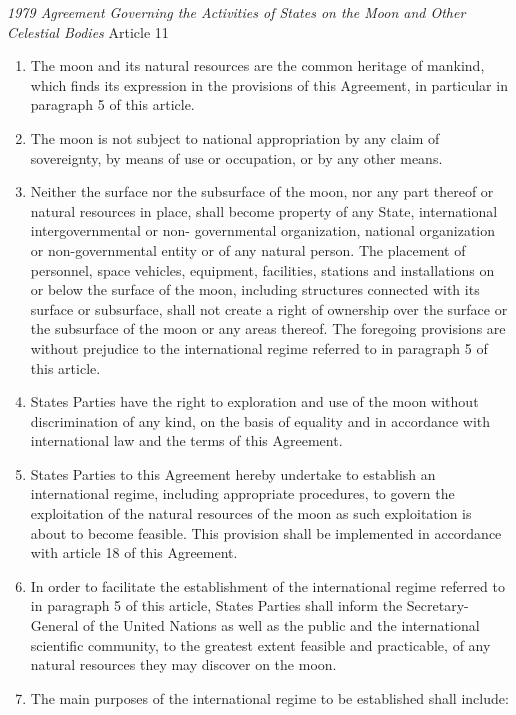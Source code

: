 \begin{conventiondetails}{\textit{1979 Agreement Governing the Activities of States on the Moon and Other Celestial Bodies} Article 11}
    \flushleft
    \begin{enumerate}
        \item The moon and its natural resources are the common heritage of mankind, which finds its expression in the provisions of this Agreement, in particular in paragraph 5 of this article.
        \item The moon is not subject to national appropriation by any claim of sovereignty, by means of use or occupation, or by any other means.
        \item Neither the surface nor the subsurface of the moon, nor any part thereof or natural resources in place, shall become property of any State, international intergovernmental or non- governmental organization, national organization or non-governmental entity or of any natural person. The placement of personnel, space vehicles, equipment, facilities, stations and installations on or below the surface of the moon, including structures connected with its surface or subsurface, shall not create a right of ownership over the surface or the subsurface of the moon or any areas thereof. The foregoing provisions are without prejudice to the international regime referred to in paragraph 5 of this article.
        \item States Parties have the right to exploration and use of the moon without discrimination of any kind, on the basis of equality and in accordance with international law and the terms of this Agreement.
        \item States Parties to this Agreement hereby undertake to establish an international regime, including appropriate procedures, to govern the exploitation of the natural resources of the moon as such exploitation is about to become feasible. This provision shall be implemented in accordance with article 18 of this Agreement.
        \item In order to facilitate the establishment of the international regime referred to in paragraph 5 of this article, States Parties shall inform the Secretary-General of the United Nations as well as the public and the international scientific community, to the greatest extent feasible and practicable, of any natural resources they may discover on the moon.
        \item The main purposes of the international regime to be established shall include:

\end{enumerate}
\end{conventiondetails}
